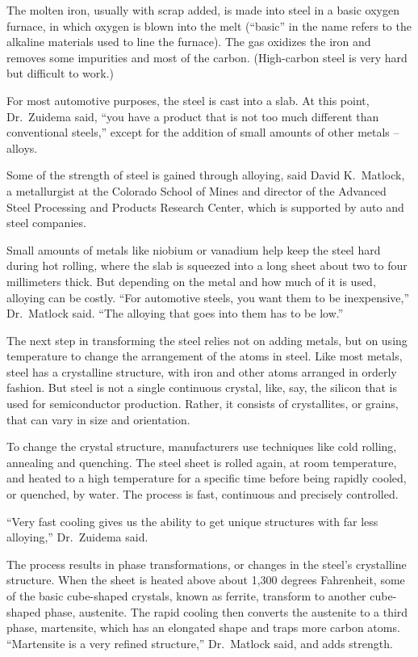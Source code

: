 ﻿\documentclass[12pt]{article}
\begin{document}
The molten iron, usually with scrap added, is made into steel in a basic oxygen furnace, in which
oxygen is blown into the melt (``basic'' in the name refers to the alkaline materials used to line
the furnace). The gas oxidizes the iron and removes some impurities and most of the carbon.
(High-carbon steel is very hard but difficult to work.)

For most automotive purposes, the steel is cast into a slab. At this point, Dr.~Zuidema said, ``you
have a product that is not too much different than conventional steels,'' except for the addition of
small amounts of other metals -- alloys.

Some of the strength of steel is gained through alloying, said David K.~Matlock, a metallurgist at
the Colorado School of Mines and director of the Advanced Steel Processing and Products Research
Center, which is supported by auto and steel companies.

Small amounts of metals like niobium or vanadium help keep the steel hard during hot rolling, where
the slab is squeezed into a long sheet about two to four millimeters thick. But depending on the
metal and how much of it is used, alloying can be costly. ``For automotive steels, you want them to
be inexpensive,'' Dr.~Matlock said. ``The alloying that goes into them has to be low.''

The next step in transforming the steel relies not on adding metals, but on using temperature to
change the arrangement of the atoms in steel. Like most metals, steel has a crystalline structure,
with iron and other atoms arranged in orderly fashion. But steel is not a single continuous crystal,
like, say, the silicon that is used for semiconductor production. Rather, it consists of
crystallites, or grains, that can vary in size and orientation.

To change the crystal structure, manufacturers use techniques like cold rolling, annealing and
quenching. The steel sheet is rolled again, at room temperature, and heated to a high temperature
for a specific time before being rapidly cooled, or quenched, by water. The process is fast,
continuous and precisely controlled.

``Very fast cooling gives us the ability to get unique structures with far less alloying,''
Dr.~Zuidema said.

The process results in phase transformations, or changes in the steel's crystalline structure. When
the sheet is heated above about 1,300 degrees Fahrenheit, some of the basic cube-shaped crystals,
known as ferrite, transform to another cube-shaped phase, austenite. The rapid cooling then converts
the austenite to a third phase, martensite, which has an elongated shape and traps more carbon
atoms. ``Martensite is a very refined structure,'' Dr.~Matlock said, and adds strength.
\end{document}
